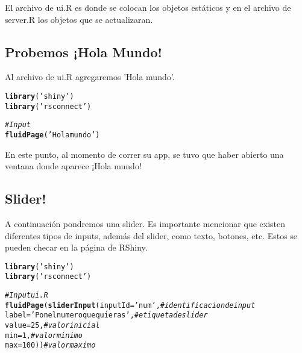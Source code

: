 \documentclass[11pt, oneside]{article}\usepackage[]{graphicx}\usepackage[]{color}
\makeatletter
\newcommand{\hlnum}[1]{\textcolor[rgb]{0.686,0.059,0.569}{#1}}%
\newcommand{\hlstr}[1]{\textcolor[rgb]{0.192,0.494,0.8}{#1}}%
\newcommand{\hlcom}[1]{\textcolor[rgb]{0.678,0.584,0.686}{\textit{#1}}}%
\newcommand{\hlstd}[1]{\textcolor[rgb]{0.345,0.345,0.345}{#1}}%
\newcommand{\hlkwc}[1]{\textcolor[rgb]{0.333,0.667,0.333}{#1}}%
\newcommand{\hlkwd}[1]{\textcolor[rgb]{0.737,0.353,0.396}{\textbf{#1}}}%
\newenvironment{kframe}{%
 \def\at@end@of@kframe{}%
 \ifinner\ifhmode%
  \def\at@end@of@kframe{\end{minipage}}%
  \begin{minipage}{\columnwidth}%
 \fi\fi%
 \def\FrameCommand##1{\hskip\@totalleftmargin \hskip-\fboxsep
 \colorbox{shadecolor}{##1}\hskip-\fboxsep
     \hskip-\linewidth \hskip-\@totalleftmargin \hskip\columnwidth}%
 \MakeFramed {\advance\hsize-\width
   \@totalleftmargin\z@ \linewidth\hsize
   \@setminipage}}%
 {\par\unskip\endMakeFramed%
 \at@end@of@kframe}
\newenvironment{knitrout}{}{} %
\makeatother
\begin{document}
El archivo de ui.R es donde se colocan los objetos estáticos y en el archivo de server.R los objetos que se actualizaran. 

\subsection{Probemos ¡Hola Mundo!}

Al archivo de ui.R agregaremos 'Hola mundo'. 

\begin{knitrout}
\color{fgcolor}\begin{kframe}
\begin{alltt}
\hlkwd{library}\hlstd{(}\hlstr{'shiny'}\hlstd{)}
\hlkwd{library}\hlstd{(}\hlstr{'rsconnect'}\hlstd{)}

\hlcom{# Input}
\hlkwd{fluidPage}\hlstd{(}\hlstr{'Hola mundo'}\hlstd{)}
\end{alltt}
\end{kframe}
\end{knitrout}

En este punto, al momento de correr su app, se tuvo que haber abierto una ventana donde aparece ¡Hola mundo!

\subsection{Slider!}

A continuación pondremos una slider. Es importante mencionar que existen diferentes tipos de inputs, además del slider, como texto, botones, etc. Estos se pueden checar en la página de RShiny. 

\begin{knitrout}
\color{fgcolor}\begin{kframe}
\begin{alltt}
\hlkwd{library}\hlstd{(}\hlstr{'shiny'}\hlstd{)}
\hlkwd{library}\hlstd{(}\hlstr{'rsconnect'}\hlstd{)}

\hlcom{# Input ui.R}
\hlkwd{fluidPage}\hlstd{(}\hlkwd{sliderInput}\hlstd{(}\hlkwc{inputId}\hlstd{=} \hlstr{'num'}\hlstd{,} \hlcom{#identificacion de input}
                      \hlkwc{label}\hlstd{=}\hlstr{'Pon el numero que quieras'}\hlstd{,} \hlcom{#etiqueta de slider}
                      \hlkwc{value}\hlstd{=}\hlnum{25}\hlstd{,} \hlcom{#valor inicial}
                      \hlkwc{min}\hlstd{=}\hlnum{1}\hlstd{,} \hlcom{#valor minimo}
                      \hlkwc{max}\hlstd{=}\hlnum{100}\hlstd{))} \hlcom{#valor maximo}
\end{alltt}
\end{kframe}
\end{knitrout}
\end{document}
